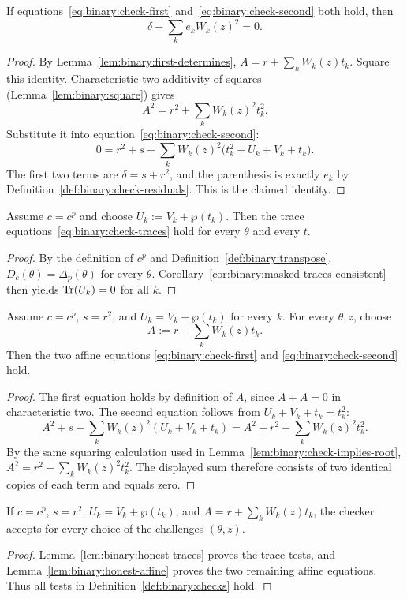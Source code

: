 \begin{lemma}\label{lem:binary:check-implies-root}
If equations~\eqref{eq:binary:check-first}
and~\eqref{eq:binary:check-second} both hold, then
\[
 \boxed{\delta+\sum_ke_kW_k(z)^2=0.}
\]
\end{lemma}
\begin{proof}
By Lemma~\ref{lem:binary:first-determines},
$A=r+\sum_kW_k(z)t_k$. Square this identity.
Characteristic-two additivity of squares
(Lemma~\ref{lem:binary:square}) gives
\[
 A^2=r^2+\sum_kW_k(z)^2t_k^2.
\]
Substitute it into equation~\eqref{eq:binary:check-second}:
\[
 0=r^2+s+
   \sum_kW_k(z)^2\bigl(t_k^2+U_k+V_k+t_k\bigr).
\]
The first two terms are $\delta=s+r^2$,
and the parenthesis is exactly $e_k$ by
Definition~\ref{def:binary:check-residuals}.
This is the claimed identity.
\end{proof}

\begin{lemma}\label{lem:binary:honest-traces}
Assume $c=c^p$ and choose
$U_k:=V_k+\wp(t_k)$.
Then the trace equations~\eqref{eq:binary:check-traces}
hold for every $\theta$ and every $t$.
\end{lemma}
\begin{proof}
By the definition of $c^p$ and
Definition~\ref{def:binary:transpose},
$D_c(\theta)=\Delta_p(\theta)$ for every $\theta$.
Corollary~\ref{cor:binary:masked-traces-consistent}
then yields $\operatorname{Tr}(U_k)=0$ for all $k$.
\end{proof}

\begin{lemma}\label{lem:binary:honest-affine}
Assume $c=c^p$, $s=r^2$, and
$U_k=V_k+\wp(t_k)$ for every $k$.
For every $\theta,z$, choose
\[
 A:=r+\sum_kW_k(z)t_k.
\]
Then the two affine equations
\eqref{eq:binary:check-first} and
\eqref{eq:binary:check-second} hold.
\end{lemma}
\begin{proof}
The first equation holds by definition of $A$,
since $A+A=0$ in characteristic two.
The second equation follows from
$U_k+V_k+t_k=t_k^2$:
\[
 A^2+s+\sum_kW_k(z)^2(U_k+V_k+t_k)
 =A^2+r^2+\sum_kW_k(z)^2t_k^2.
\]
By the same squaring calculation used in
Lemma~\ref{lem:binary:check-implies-root},
$A^2=r^2+\sum_kW_k(z)^2t_k^2$.
The displayed sum therefore consists of two
identical copies of each term and equals zero.
\end{proof}

\begin{theorem}\label{thm:binary:checker-complete}
If $c=c^p$, $s=r^2$, $U_k=V_k+\wp(t_k)$, and
$A=r+\sum_kW_k(z)t_k$, the checker accepts for
every choice of the challenges $(\theta,z)$.
\end{theorem}
\begin{proof}
Lemma~\ref{lem:binary:honest-traces} proves the
trace tests, and Lemma~\ref{lem:binary:honest-affine}
proves the two remaining affine equations.
Thus all tests in Definition~\ref{def:binary:checks}
hold.
\end{proof}

